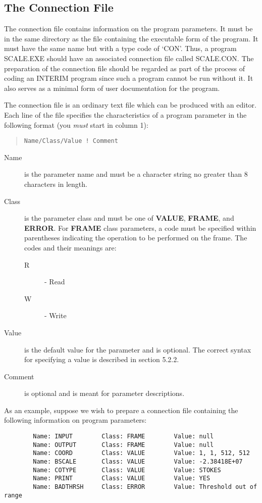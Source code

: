 \documentclass{article}
\begin{document}
\subsection {The Connection File}
The connection file contains information on the program parameters.
It must be in the same directory as the file containing the executable
form of the program.
It must have the same name but with a type code of `CON'.
Thus, a program SCALE.EXE should have an associated connection file called
SCALE.CON.
The preparation of the connection file should be regarded as part of the
process of coding an INTERIM program since such a program cannot be run
without it.
It also serves as a minimal form of user documentation for the program.

The connection file is an ordinary text file which can be produced with an
editor.
Each line of the file specifies the characteristics of a program parameter
in the following format (you {\em must} start in column 1):
\begin{quote}
{\tt Name/Class/Value	! Comment}
\end{quote}
\begin{description}
\item [Name] is the parameter name and must be a character string no greater
than 8 characters in length.
\item [Class] is the parameter class and must be one of {\bf VALUE},
{\bf FRAME}, and {\bf ERROR}.
For {\bf FRAME} class parameters, a code must be specified within parentheses
indicating the operation to be performed on the frame.
The codes and their meanings are:
\begin{description}
\item [R] - Read
\item [W] - Write
\end{description}
\item [Value] is the default value for the parameter and is optional.
The correct syntax for specifying a value is described in section 5.2.2.
\item [Comment] is optional and is meant for parameter descriptions.
\end{description}
As an example, suppose we wish to prepare a connection file containing the
following information on program parameters:
\begin{verbatim}
        Name: INPUT        Class: FRAME        Value: null
        Name: OUTPUT       Class: FRAME        Value: null
        Name: COORD        Class: VALUE        Value: 1, 1, 512, 512
        Name: BSCALE       Class: VALUE        Value: -2.38418E+07
        Name: COTYPE       Class: VALUE        Value: STOKES
        Name: PRINT        Class: VALUE        Value: YES
        Name: BADTHRSH     Class: ERROR        Value: Threshold out of range
\end{verbatim}
\end{document}
